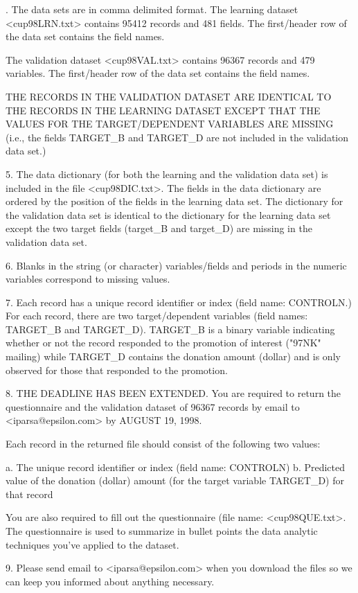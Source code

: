 \documentclass[
  11pt,
  a4paper,
  DIV=12,captions=tableheading,oneside,titlepage]{scrbook}
\let\oldverbatim\verbatim
\let\endoldverbatim\endverbatim
\renewenvironment{verbatim}{\footnotesize\oldverbatim}{\endoldverbatim}
\begin{document}
\begin{verbatim}
4. The data sets are in comma delimited format. The learning dataset
<cup98LRN.txt> contains 95412 records and 481 fields. The first/header
row of the data set contains the field names.

The validation dataset <cup98VAL.txt> contains 96367 records and 479
variables. The first/header row of the data set contains the field
names.

THE RECORDS IN THE VALIDATION DATASET ARE IDENTICAL TO THE RECORDS IN
THE LEARNING DATASET EXCEPT THAT THE VALUES FOR THE TARGET/DEPENDENT
VARIABLES ARE MISSING (i.e., the fields TARGET_B and TARGET_D are
not included in the validation data set.)

5. The data dictionary (for both the learning and the validation data
set) is included in the file <cup98DIC.txt>. The fields in the data
dictionary are ordered by the position of the fields in the learning
data set. The dictionary for the validation data set is identical to
the dictionary for the learning data set except the two target fields
(target_B and target_D) are missing in the validation data set.

6. Blanks in the string (or character) variables/fields and periods in
the numeric variables correspond to missing values.

7. Each record has a unique record identifier or index (field name:
CONTROLN.) For each record, there are two target/dependent variables
(field names: TARGET_B and TARGET_D). TARGET_B is a binary variable
indicating whether or not the record responded to the promotion of
interest ("97NK" mailing) while TARGET_D contains the donation amount
(dollar) and is only observed for those that responded to the
promotion.

8. THE DEADLINE HAS BEEN EXTENDED. You are required to return the
questionnaire and the validation dataset of 96367 records by email to
<iparsa@epsilon.com> by AUGUST 19, 1998.

Each record in the returned file should consist of the following two
values:

a. The unique record identifier or index (field name: CONTROLN)
b. Predicted value of the donation (dollar) amount (for the target
variable TARGET_D) for that record 

You are also required to fill out the questionnaire (file name:
<cup98QUE.txt>. The questionnaire is used to summarize in bullet
points the data analytic techniques you've applied to the dataset.

9. Please send email to <iparsa@epsilon.com> when you download the
files so we can keep you informed about anything necessary.


\end{verbatim}
\end{document}
